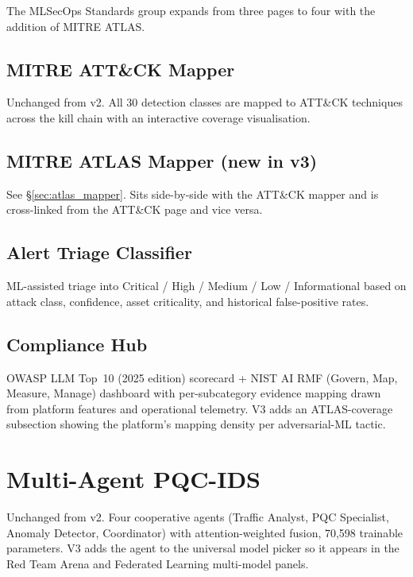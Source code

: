\documentclass[11pt,a4paper]{article}
\begin{document}
The MLSecOps Standards group expands from three pages to four with
the addition of MITRE ATLAS.

\subsection{MITRE ATT\&CK Mapper}
Unchanged from v2.  All 30 detection classes are mapped to ATT\&CK
techniques across the kill chain with an interactive coverage
visualisation.

\subsection{MITRE ATLAS Mapper (new in v3)}
See \S\ref{sec:atlas_mapper}.  Sits side-by-side with the ATT\&CK
mapper and is cross-linked from the ATT\&CK page and vice versa.

\subsection{Alert Triage Classifier}
ML-assisted triage into Critical / High / Medium / Low / Informational
based on attack class, confidence, asset criticality, and historical
false-positive rates.

\subsection{Compliance Hub}
OWASP LLM Top~10 (2025 edition) scorecard + NIST AI RMF (Govern, Map,
Measure, Manage) dashboard with per-subcategory evidence mapping
drawn from platform features and operational telemetry.  V3 adds an
ATLAS-coverage subsection showing the platform's mapping density per
adversarial-ML tactic.

\section{Multi-Agent PQC-IDS}
\label{sec:pqc_ids}

Unchanged from v2.  Four cooperative agents (Traffic Analyst, PQC
Specialist, Anomaly Detector, Coordinator) with attention-weighted
fusion, 70,598 trainable parameters.  V3 adds the agent to the
universal model picker so it appears in the Red Team Arena and
Federated Learning multi-model panels.

\end{document}
